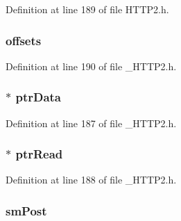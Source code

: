 Definition at line 189 of file H\+T\+T\+P2.\+h.

\hypertarget{struct_h_t_t_p___c_o_n_n_abf0503ef5f942f9227ac2c1df6fb9ffb}{}
\subsubsection[{offsets}]{ offsets}\label{struct_h_t_t_p___c_o_n_n_abf0503ef5f942f9227ac2c1df6fb9ffb}


Definition at line 190 of file \+\_\+\+H\+T\+T\+P2.\+h.

\hypertarget{struct_h_t_t_p___c_o_n_n_a18c16d16b06a76902bdf3e60b1367369}{}
\subsubsection[{ptr\+Data}]{ $\ast$ ptr\+Data}\label{struct_h_t_t_p___c_o_n_n_a18c16d16b06a76902bdf3e60b1367369}


Definition at line 187 of file \+\_\+\+H\+T\+T\+P2.\+h.

\hypertarget{struct_h_t_t_p___c_o_n_n_a8e43a11f6094f838f219bacc830ee9b4}{}
\subsubsection[{ptr\+Read}]{ $\ast$ ptr\+Read}\label{struct_h_t_t_p___c_o_n_n_a8e43a11f6094f838f219bacc830ee9b4}


Definition at line 188 of file \+\_\+\+H\+T\+T\+P2.\+h.

\hypertarget{struct_h_t_t_p___c_o_n_n_a819113468a27c4dd9ad6d0da54af08bd}{}
\subsubsection[{sm\+Post}]{ sm\+Post}\label{struct_h_t_t_p___c_o_n_n_a819113468a27c4dd9ad6d0da54af08bd}



